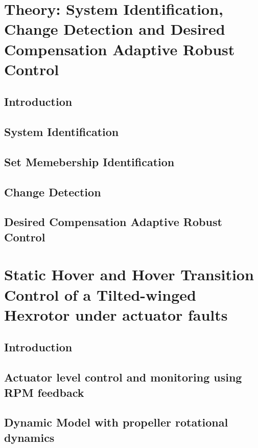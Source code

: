 \documentclass{PurdueThesis}
\begin{document}
\makeatletter
\renewcommand{\ZZAppendixName}{APPENDIX}
\def\@@makechapterhead#1{\uppercase{\@chapapp~\thechapter. #1}}

\setcounter{tocdepth}{3}

\maketitle




\part{Theory: System Identification, Change Detection and Desired Compensation Adaptive Robust Control}
\chapter{Introduction}
\chapter{System Identification}
\chapter{Set Memebership Identification}
\chapter{Change Detection}
\chapter{Desired Compensation Adaptive Robust Control}

\part{Static Hover and Hover Transition Control of a Tilted-winged Hexrotor under actuator faults}
\chapter{Introduction}
\chapter{Actuator level control and monitoring using RPM feedback}
\chapter{Dynamic Model with propeller rotational dynamics}
\end{document}
